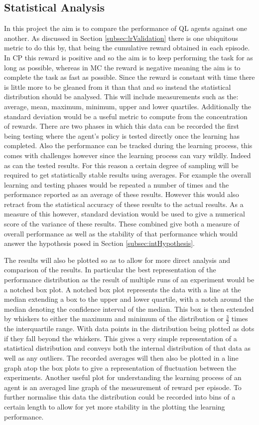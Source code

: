 \documentclass[hidelinks,journal]{IEEEtran}
\begin{document}
\subsection{Statistical Analysis}
\label{subsec:mthdStats}
In this project the aim is to compare the performance of QL agents against one another. As discussed in Section \ref{subsec:lrValidation} there is one ubiquitous metric to do this by, that being the cumulative reward obtained in each episode. In CP this reward is positive and so the aim is to keep performing the task for as long as possible, whereas in MC the reward is negative meaning the aim is to complete the task as fast as possible. Since the reward is constant with time there is little more to be gleaned from it than that and so instead the statistical distribution should be analysed. This will include measurements such as the: average, mean, maximum, minimum, upper and lower quartiles. Additionally the standard deviation would be a useful metric to compute from the concentration of rewards. There are two phases in which this data can be recorded the first being testing where the agent’s policy is tested directly once the learning has completed. Also the performance can be tracked during the learning process, this comes with challenges however since the learning process can vary wildly. Indeed as can the tested results. For this reason a certain degree of sampling will be required to get statistically stable results using averages. For example the overall learning and testing phases would be repeated a number of times and the performance reported as an average of these results. However this would also retract from the statistical accuracy of these results to the actual results. As a measure of this however, standard deviation would be used to give a numerical score of the variance of these results. These combined give both a measure of overall performance as well as the stability of that performance which would answer the hypothesis posed in Section \ref{subsec:intHypothesis}.

The results will also be plotted so as to allow for more direct analysis and comparison of the results. In particular the best representation of the performance distribution as the result of multiple runs of an experiment would be a notched box plot. A notched box plot represents the data with a line at the median extending a box to the upper and lower quartile, with a notch around the median denoting the confidence interval of the median. This box is then extended by whiskers to either the maximum and minimum of the distribution or $\frac{3}{2}$ times the interquartile range. With data points in the distribution being plotted as dots if they fall beyond the whiskers. This gives a very simple representation of a statistical distribution and conveys both the internal distribution of that data as well as any outliers. The recorded averages will then also be plotted in a line graph atop the box plots to give a representation of fluctuation between the experiments. Another useful plot for understanding the learning process of an agent is an averaged line graph of the measurement of reward per episode. To further normalise this data the distribution could be recorded into bins of a certain length to allow for yet more stability in the plotting the learning performance.
\end{document}
